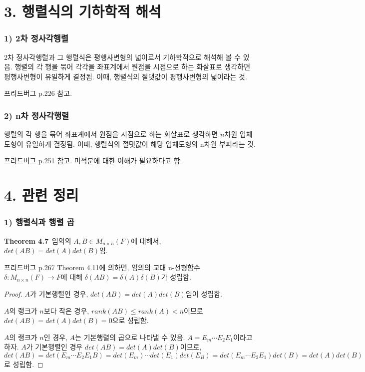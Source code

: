 \newpage


\section*{3. 행렬식의 기하학적 해석}
\subsubsection*{1) 2차 정사각행렬}
2차 정사각행렬과 그 행렬식은 평행사변형의 넓이로서 기하학적으로 해석해 볼 수 있음. 행렬의 각 행을 묶어 각각을 좌표계에서 원점을 시점으로 하는 화살표로 생각하면 평행사변형이 유일하게 결정됨. 이때, 행렬식의 절댓값이 평행사변형의 넓이라는 것.

프리드버그 p.226 참고.

\subsubsection*{2) n차 정사각행렬}
행렬의 각 행을 묶어 좌표계에서 원점을 시점으로 하는 화살표로 생각하면 $n$차원 입체도형이 유일하게 결정됨. 이때, 행렬식의 절댓값이 해당 입체도형의 n차원 부피라는 것.

프리드버그 p.251 참고. 미적분에 대한 이해가 필요하다고 함.\\


\section*{4. 관련 정리}
\subsubsection*{1) 행렬식과 행렬 곱}
\textbf{Theorem 4.7}\, 임의의 $A,B \in M_{n \times n}(F)$에 대해서, $det(AB)=det(A)det(B)$임.

프리드버그 p.267 Theorem 4.11에 의하면, 임의의 교대 n-선형함수 $\delta:M_{n \times n}(F) \rightarrow F$에 대해 $\delta(AB)=\delta(A)\delta(B)$가 성립함.

\begin{proof}
$A$가 기본행렬인 경우, $det(AB)=det(A)det(B)$임이 성립함.

$A$의 랭크가 $n$보다 작은 경우, $rank(AB) \leq rank(A) < n$이므로 $det(AB)=det(A)det(B)=0$으로 성립함.

$A$의 랭크가 $n$인 경우, $A$는 기본행렬의 곱으로 나타낼 수 있음. $A=E_{m} \cdots E_{2}E_{1}$이라고 하자. $A$가 기본행렬인 경우 $det(AB)=det(A)det(B)$이므로, $det(AB)=det(E_{m} \cdots E_{2}E_{1}B)=det(E_{m}) \cdots det(E_{1})det(E_{B})=det(E_{m} \cdots E_{2}E_{1})det(B)=det(A)det(B)$로 성립함.
\end{proof}

